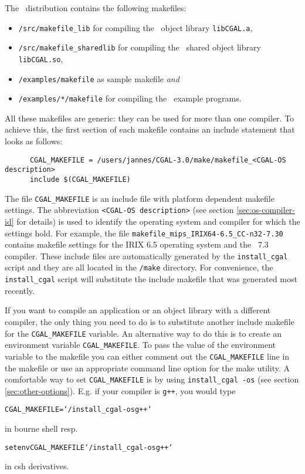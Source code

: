 The \cgal\ distribution contains the following makefiles:
\begin{itemize}
\item \texttt{\cgaldir/src/makefile\_lib} for compiling the \cgal\ 
  object library \texttt{libCGAL.a},
  
\item \texttt{\cgaldir/src/makefile\_sharedlib} for compiling the
  \cgal\ shared object library \texttt{libCGAL.so},
  
\item \texttt{\cgaldir/examples/makefile} as sample makefile
  \textit{and}
  
\item \texttt{\cgaldir/examples/*/makefile} for compiling the \cgal\ 
  example programs.
\end{itemize}

All these makefiles are generic: they can be used for more than one
compiler.  To achieve this, the first section of each makefile
contains an include statement that looks as follows:

\begin{verbatim}
      CGAL_MAKEFILE = /users/jannes/CGAL-3.0/make/makefile_<CGAL-OS description>
      include $(CGAL_MAKEFILE)
\end{verbatim}

The file \texttt{CGAL\_MAKEFILE} is an include
file with platform dependent makefile
settings. The abbreviation \texttt{<CGAL-OS description>} (see section
\ref{sec:os-compiler-id} for details) is used to identify the
operating system and compiler for which the settings hold. For
example, the file \texttt{makefile\_mips\_IRIX64-6.5\_CC-n32-7.30}
contains makefile settings for the IRIX 6.5 operating system and the
\mipsprocc\ 7.3 compiler.  These include files are automatically
generated by the \texttt{install\_cgal} script and they are all
located in the \texttt{\cgaldir/make} directory.  For convenience, the
\texttt{install\_cgal} script will substitute the include makefile
that was generated most recently.

If you want to compile an application or an object library with a
different compiler, the only thing you need to do is to substitute
another include makefile for the \texttt{CGAL\_MAKEFILE} variable. An
alternative way to do this is to create an environment variable
\texttt{CGAL\_MAKEFILE}. To pass the value of the environment variable
to the makefile you can either comment out the \texttt{CGAL\_MAKEFILE}
line in the makefile or use an appropriate command line option for the
make utility.  A comfortable way to set \texttt{CGAL\_MAKEFILE} is by
using \texttt{install\_cgal~-os} (see section
\ref{sec:other-options}).  E.g. if your compiler is \texttt{g++}, you
would type
\begin{alltt}
CGAL_MAKEFILE=`\yourcgaldir/install_cgal -os g++`
\end{alltt}
in bourne shell resp.
\begin{alltt}
setenv CGAL_MAKEFILE `\yourcgaldir/install_cgal -os g++`
\end{alltt}
in csh derivatives. 

